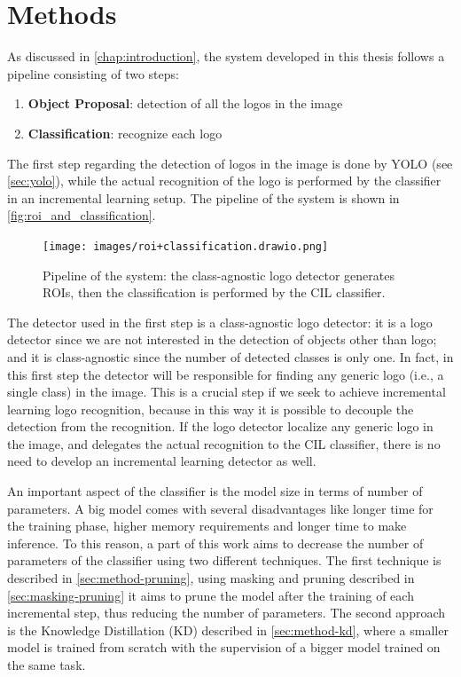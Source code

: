 \chapter{Methods}
\label{chap:methods}

As discussed in \autoref{chap:introduction}, the system developed in this thesis follows a pipeline consisting of two steps:
\begin{enumerate}
    \item \textbf{Object Proposal}: detection of all the logos in the image
    \item \textbf{Classification}: recognize each logo
\end{enumerate}
The first step regarding the detection of logos in the image is done by YOLO (see \autoref{sec:yolo}), while the actual recognition of the logo is performed by the classifier in an incremental learning setup. The pipeline of the system is shown in \autoref{fig:roi_and_classification}.

\begin{figure}%
	\centering

    \begin{center}
        \texttt{[image: images/roi+classification.drawio.png]}
    \end{center}

	\caption{Pipeline of the system: the class-agnostic logo detector generates ROIs, then the classification is performed by the CIL classifier.}%
	\label{fig:roi_and_classification}%
\end{figure}

The detector used in the first step is a class-agnostic logo detector: it is a logo detector since we are not interested in the detection of objects other than logo; and it is class-agnostic since the number of detected classes is only one. In fact, in this first step the detector will be responsible for finding any generic logo (i.e., a single class) in the image. This is a crucial step if we seek to achieve incremental learning logo recognition, because in this way it is possible to decouple the detection from the recognition. If the logo detector localize any generic logo in the image, and delegates the actual recognition to the CIL classifier, there is no need to develop an incremental learning detector as well.


An important aspect of the classifier is the model size in terms of number of parameters. A big model comes with several disadvantages like longer time for the training phase, higher memory requirements and longer time to make inference. To this reason, a part of this work aims to decrease the number of parameters of the classifier using two different techniques. The first technique is described in \autoref{sec:method-pruning}, using masking and pruning described in \autoref{sec:masking-pruning} it aims to prune the model after the training of each incremental step, thus reducing the number of parameters. The second approach is the Knowledge Distillation (KD) described in \autoref{sec:method-kd}, where a smaller model is trained from scratch with the supervision of a bigger model trained on the same task.



